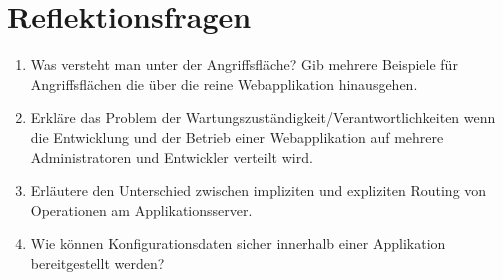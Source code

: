 \section{Reflektionsfragen}

\begin{enumerate}
	\item Was versteht man unter der Angriffsfläche? Gib mehrere Beispiele für Angriffsflächen die über die reine Webapplikation hinausgehen.
	\item Erkläre das Problem der Wartungszuständigkeit/Verantwortlichkeiten wenn die Entwicklung und der Betrieb einer Webapplikation auf mehrere Administratoren und Entwickler verteilt wird.
	\item Erläutere den Unterschied zwischen impliziten und expliziten Routing von Operationen am Applikationsserver.
	\item Wie können Konfigurationsdaten sicher innerhalb einer Applikation bereitgestellt werden?
\end{enumerate}

